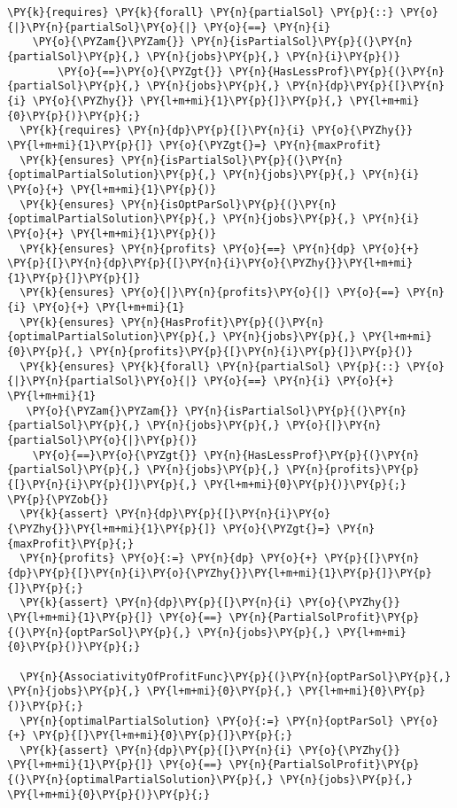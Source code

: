 \begin{itemize}
\begin{Verbatim}[commandchars=\\\{\},fontsize=\footnotesize]
  \PY{k}{requires} \PY{k}{forall} \PY{n}{partialSol} \PY{p}{::} \PY{o}{|}\PY{n}{partialSol}\PY{o}{|} \PY{o}{==} \PY{n}{i}  
    \PY{o}{\PYZam{}\PYZam{}} \PY{n}{isPartialSol}\PY{p}{(}\PY{n}{partialSol}\PY{p}{,} \PY{n}{jobs}\PY{p}{,} \PY{n}{i}\PY{p}{)} 
        \PY{o}{==}\PY{o}{\PYZgt{}} \PY{n}{HasLessProf}\PY{p}{(}\PY{n}{partialSol}\PY{p}{,} \PY{n}{jobs}\PY{p}{,} \PY{n}{dp}\PY{p}{[}\PY{n}{i} \PY{o}{\PYZhy{}} \PY{l+m+mi}{1}\PY{p}{]}\PY{p}{,} \PY{l+m+mi}{0}\PY{p}{)}\PY{p}{;} 
  \PY{k}{requires} \PY{n}{dp}\PY{p}{[}\PY{n}{i} \PY{o}{\PYZhy{}} \PY{l+m+mi}{1}\PY{p}{]} \PY{o}{\PYZgt{}=} \PY{n}{maxProfit}
  \PY{k}{ensures} \PY{n}{isPartialSol}\PY{p}{(}\PY{n}{optimalPartialSolution}\PY{p}{,} \PY{n}{jobs}\PY{p}{,} \PY{n}{i} \PY{o}{+} \PY{l+m+mi}{1}\PY{p}{)}
  \PY{k}{ensures} \PY{n}{isOptParSol}\PY{p}{(}\PY{n}{optimalPartialSolution}\PY{p}{,} \PY{n}{jobs}\PY{p}{,} \PY{n}{i} \PY{o}{+} \PY{l+m+mi}{1}\PY{p}{)}
  \PY{k}{ensures} \PY{n}{profits} \PY{o}{==} \PY{n}{dp} \PY{o}{+} \PY{p}{[}\PY{n}{dp}\PY{p}{[}\PY{n}{i}\PY{o}{\PYZhy{}}\PY{l+m+mi}{1}\PY{p}{]}\PY{p}{]}
  \PY{k}{ensures} \PY{o}{|}\PY{n}{profits}\PY{o}{|} \PY{o}{==} \PY{n}{i} \PY{o}{+} \PY{l+m+mi}{1}
  \PY{k}{ensures} \PY{n}{HasProfit}\PY{p}{(}\PY{n}{optimalPartialSolution}\PY{p}{,} \PY{n}{jobs}\PY{p}{,} \PY{l+m+mi}{0}\PY{p}{,} \PY{n}{profits}\PY{p}{[}\PY{n}{i}\PY{p}{]}\PY{p}{)}
  \PY{k}{ensures} \PY{k}{forall} \PY{n}{partialSol} \PY{p}{::} \PY{o}{|}\PY{n}{partialSol}\PY{o}{|} \PY{o}{==} \PY{n}{i} \PY{o}{+} \PY{l+m+mi}{1}
   \PY{o}{\PYZam{}\PYZam{}} \PY{n}{isPartialSol}\PY{p}{(}\PY{n}{partialSol}\PY{p}{,} \PY{n}{jobs}\PY{p}{,} \PY{o}{|}\PY{n}{partialSol}\PY{o}{|}\PY{p}{)}
    \PY{o}{==}\PY{o}{\PYZgt{}} \PY{n}{HasLessProf}\PY{p}{(}\PY{n}{partialSol}\PY{p}{,} \PY{n}{jobs}\PY{p}{,} \PY{n}{profits}\PY{p}{[}\PY{n}{i}\PY{p}{]}\PY{p}{,} \PY{l+m+mi}{0}\PY{p}{)}\PY{p}{;}
\PY{p}{\PYZob{}}
  \PY{k}{assert} \PY{n}{dp}\PY{p}{[}\PY{n}{i}\PY{o}{\PYZhy{}}\PY{l+m+mi}{1}\PY{p}{]} \PY{o}{\PYZgt{}=} \PY{n}{maxProfit}\PY{p}{;}
  \PY{n}{profits} \PY{o}{:=} \PY{n}{dp} \PY{o}{+} \PY{p}{[}\PY{n}{dp}\PY{p}{[}\PY{n}{i}\PY{o}{\PYZhy{}}\PY{l+m+mi}{1}\PY{p}{]}\PY{p}{]}\PY{p}{;}
  \PY{k}{assert} \PY{n}{dp}\PY{p}{[}\PY{n}{i} \PY{o}{\PYZhy{}} \PY{l+m+mi}{1}\PY{p}{]} \PY{o}{==} \PY{n}{PartialSolProfit}\PY{p}{(}\PY{n}{optParSol}\PY{p}{,} \PY{n}{jobs}\PY{p}{,} \PY{l+m+mi}{0}\PY{p}{)}\PY{p}{;}

  \PY{n}{AssociativityOfProfitFunc}\PY{p}{(}\PY{n}{optParSol}\PY{p}{,} \PY{n}{jobs}\PY{p}{,} \PY{l+m+mi}{0}\PY{p}{,} \PY{l+m+mi}{0}\PY{p}{)}\PY{p}{;}
  \PY{n}{optimalPartialSolution} \PY{o}{:=} \PY{n}{optParSol} \PY{o}{+} \PY{p}{[}\PY{l+m+mi}{0}\PY{p}{]}\PY{p}{;}
  \PY{k}{assert} \PY{n}{dp}\PY{p}{[}\PY{n}{i} \PY{o}{\PYZhy{}} \PY{l+m+mi}{1}\PY{p}{]} \PY{o}{==} \PY{n}{PartialSolProfit}\PY{p}{(}\PY{n}{optimalPartialSolution}\PY{p}{,} \PY{n}{jobs}\PY{p}{,} \PY{l+m+mi}{0}\PY{p}{)}\PY{p}{;}


\end{Verbatim}
\end{itemize}

